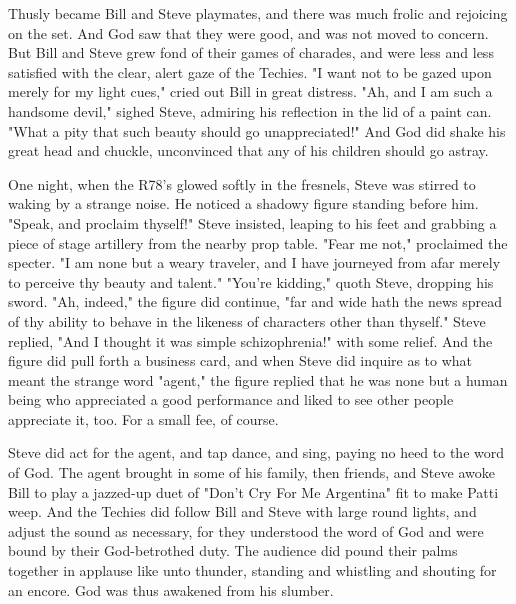 \documentclass[10pt,a4paper,oneside]{article}
\begin{document}
Thusly became Bill and Steve playmates, and there was much frolic and rejoicing on the set. And God saw that they were good, and was not moved to concern. But Bill and Steve grew fond of their games of charades, and were less and less satisfied with the clear, alert gaze of the Techies. "I want not to be gazed upon merely for my light cues," cried out Bill in great distress. "Ah, and I am such a handsome devil," sighed Steve, admiring his reflection in the lid of a paint can. "What a pity that such beauty should go unappreciated!" And God did shake his great head and chuckle, unconvinced that any of his children should go astray.

One night, when the R78's glowed softly in the fresnels, Steve was stirred to waking by a strange noise. He noticed a shadowy figure standing before him. "Speak, and proclaim thyself!" Steve insisted, leaping to his feet and grabbing a piece of stage artillery from the nearby prop table. "Fear me not," proclaimed the specter. "I am none but a weary traveler, and I have journeyed from afar merely to perceive thy beauty and talent." "You're kidding," quoth Steve, dropping his sword. "Ah, indeed," the figure did continue, "far and wide hath the news spread of thy ability to behave in the likeness of characters other than thyself." Steve replied, "And I thought it was simple schizophrenia!" with some relief. And the figure did pull forth a business card, and when Steve did inquire as to what meant the strange word "agent," the figure replied that he was none but a human being who appreciated a good performance and liked to see other people appreciate it, too. For a small fee, of course.

Steve did act for the agent, and tap dance, and sing, paying no heed to the word of God. The agent brought in some of his family, then friends, and Steve awoke Bill to play a jazzed-up duet of "Don't Cry For Me Argentina" fit to make Patti weep. And the Techies did follow Bill and Steve with large round lights, and adjust the sound as necessary, for they understood the word of God and were bound by their God-betrothed duty. The audience did pound their palms together in applause like unto thunder, standing and whistling and shouting for an encore. God was thus awakened from his slumber.
\end{document}
